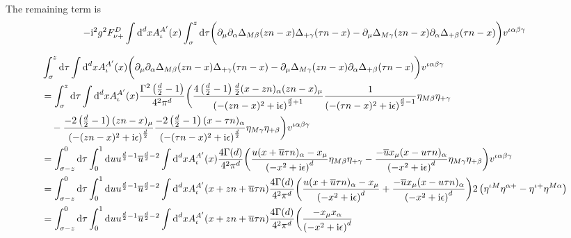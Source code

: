 The remaining term is 
\begin{align}
	-\text{i}^2 g^2 F_{\nu +} ^D\int \text{d} ^d x A_\iota^{A'}(x) \int ^z_\sigma \text{d} \tau \bigg( \partial_\mu \partial_\alpha \Delta_{M\beta}(zn-x) \Delta_{+\gamma} (\tau n - x) - \partial_\mu \Delta_{M\gamma}(zn-x) \partial_\alpha\Delta_{+\beta}(\tau n -x)\bigg)  v^{\iota \alpha\beta\gamma}
\end{align}

\begin{align}
	&\int_\sigma^z \dx \tau\int \ddx x  A_\iota^{A'}(x) \bigg( \partial_\mu \partial_\alpha \propagator_{M\beta}(zn-x) \propagator_{+\gamma} (\tau n - x) - \partial_\mu \propagator_{M\gamma}(zn-x) \partial_\alpha\propagator_{+\beta}(\tau n -x)\bigg)  v^{\iota \alpha\beta\gamma}
	\\
	&=
	\int_\sigma^z \dx \tau\int \ddx x  A_\iota^{A'}(x) \frac{\Gamma^2\left(\frac{d}{2}-1\right)}{4^2\pi^{d}}\bigg( \frac{4\left(\frac{d}{2}-1\right)\frac{d}{2}(x-zn)_\alpha (zn-x)_\mu}{\left(-(zn-x)^2+\imag \epsilon\right)^{\frac{d}{2}+1}}\frac{1}{\left(-(\tau n-x)^2+\imag \epsilon\right)^{\frac{d}{2}-1}}\metric_{M\beta}\metric_{+\gamma} 
	\nl
	- \frac{-2\left(\frac{d}{2}-1\right)(zn-x)_\mu}{\left(-(zn-x)^2+\imag \epsilon\right)^{\frac{d}{2}}}\frac{-2\left(\frac{d}{2}-1\right)(x- \tau n)_\alpha}{\left(-(\tau n-x)^2+\imag \epsilon\right)^{\frac{d}{2}}}\metric_{M\gamma}\metric_{+\beta}\bigg)  v^{\iota \alpha\beta\gamma}
	\\
	&=
	\int^{0}_{\sigma-z} \dx \tau\int _0^1 \dx u u^{\frac{d}{2}-1} \overline u ^{\frac{d}{2}-2} \int \ddx x  A_\iota^{A'}(x) \frac{4\Gamma(d)}{4^2\pi^{d}}\bigg( \frac{u(x+ \overline u \tau n)_\alpha-x_\mu}{\left(-x^2+\imag \epsilon\right)^{d}}\metric_{M\beta}\metric_{+\gamma} 
	-\frac{-\overline u x_\mu(x - u \tau n)_\alpha}{\left(-x^2+\imag \epsilon\right)^{d}}\metric_{M\gamma}\metric_{+\beta}\bigg)  v^{\iota \alpha\beta\gamma}
	\\
	&=
	\int^{0}_{\sigma-z} \dx \tau\int _0^1 \dx u u^{\frac{d}{2}-1} \overline u ^{\frac{d}{2}-2} \int \ddx x  A_\iota^{A'}(x+z n + \overline u \tau n) \frac{4\Gamma(d)}{4^2\pi^{d}}\bigg( \frac{u(x+ \overline  u \tau n)_\alpha-x_\mu}{\left(-x^2+\imag \epsilon\right)^{d}} 
	+\frac{-\overline u x_\mu(x -  u \tau n)_\alpha}{\left(-x^2+\imag \epsilon\right)^{d}}\bigg)  2\left(\metric^{\iota M } \metric^{\alpha +}  - \metric^{\iota +} \metric^{M\alpha} \right)
	\\
	&=
	\int^{0}_{\sigma-z} \dx \tau\int _0^1 \dx u u^{\frac{d}{2}-1} \overline u ^{\frac{d}{2}-2}\int \ddx x  A_\iota^{A'}(x+z n + \overline u \tau n) \frac{4\Gamma(d)}{4^2\pi^{d}}\bigg( \frac{ -x_\mu x_\alpha}{\left(-x^2+\imag \epsilon\right)^{d}} 

\end{align}
